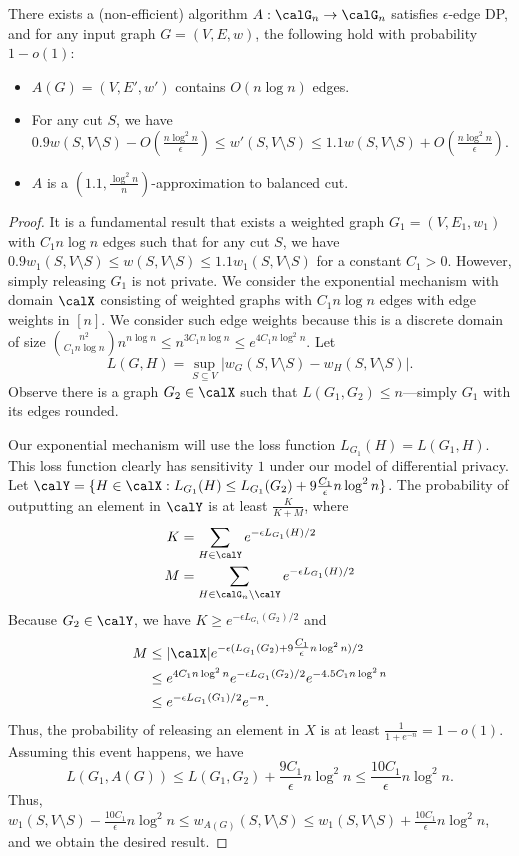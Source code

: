 \begin{lem}
There exists a (non-efficient) algorithm $A : \calG_n \rightarrow \calG_n$ satisfies $\epsilon$-edge DP, and for any input graph $G = (V, E, w)$, the following hold with probability $1-o(1)$:
\begin{itemize}
    \item $A(G) = (V, E', w')$ contains $O(n \log n)$ edges.
    \item For any cut $S$, we have $0.9w(S, V \setminus S)  - O(\frac{n \log^2 n}{\epsilon}) \leq w'(S, V \setminus S) \leq 1.1 w(S, V \setminus S) + O(\frac{n \log^2 n}{\epsilon})$.
    \item $A$ is a $(1.1, \frac{\log^2 n}{n})$-approximation to balanced cut.
\end{itemize}
\end{lem}
\begin{proof}
It is a fundamental result that exists a weighted graph $G_1 = (V, E_1, w_1)$ with $C_1 n \log n$ edges such that for any cut $S$, we have $0.9 w_1(S, V \setminus S) \leq w(S, V \setminus S) \leq 1.1 w_1(S, V \setminus S)$ for a constant $C_1 > 0$. However, simply releasing $G_1$ is not private. We consider the exponential mechanism with domain $\calX$ consisting of weighted graphs with $C_1n \log n$ edges with edge weights in $[n]$. We consider such edge weights because this is a discrete domain of size $\binom{n^2}{C_1n \log n} n^{n \log n} \leq n^{3C_1n \log n} \leq e^{4C_1n \log^2 n}$. Let
\[
L(G, H) = \sup_{S \subseteq V} |w_G(S, V \setminus S) - w_H(S, V \setminus S)|.
\]
Observe there is a graph $G_2 \in \calX$ such that $L(G_1, G_2) \leq n$---simply $G_1$ with its edges rounded.

Our exponential mechanism will use the loss function $L_{G_1}(H) = L(G_1, H)$.
This loss function clearly has sensitivity $1$ under our model of differential privacy.
Let $\calY = \{H \in \calX : L_{G_1}(H) \leq  L_{G_1}(G_2) + 9\tfrac{C_1}{\epsilon} n \log^2 n\}$. 
The probability of outputting an element in $\calY$ is at least $\frac{K}{K+M}$, where
\begin{align*}
    K &= \sum_{H \in \calY} e^{-\epsilon L_{G_1}(H)/ 2} \\
    M &= \sum_{H \in \calG_n \setminus \calY} e^{-\epsilon L_{G_1}(H) / 2}
\end{align*}
Because $G_2 \in \calY$, we have $K \geq e^{-\epsilon L_{G_1}(G_2) / 2}$ and 
\begin{align*}
    M &\leq |\calX| e^{-\epsilon (L_{G_1}(G_2) + 9\tfrac{C_1}{\epsilon} n \log^2 n)/ 2} \\
    &\leq e^{4C_1n \log^2 n}e^{-\epsilon L_{G_1}(G_2)/2} e^{-4.5C_1 n \log^2 n} \\
    &\leq e^{-\epsilon L_{G_1}(G_1)/2} e^{-n}.
\end{align*}
Thus, the probability of releasing an element in $X$ is at least $\frac{1}{1 + e^{{-n}}} = 1 - o(1)$. Assuming this event happens, we have
\[
    L(G_1, A(G)) \leq L(G_1, G_2) + \frac{9C_1}{\epsilon} n \log^2 n \leq \frac{10C_1}{\epsilon} n \log^2 n.
\]
Thus, $w_1(S, V \setminus S) - \frac{10C_1}{\epsilon} n \log^2 n \leq w_{A(G)} (S, V \setminus S) \leq w_1(S, V \setminus S) + \frac{10C_1}{\epsilon} n \log^2 n$, and we obtain the desired result.


\end{proof}

